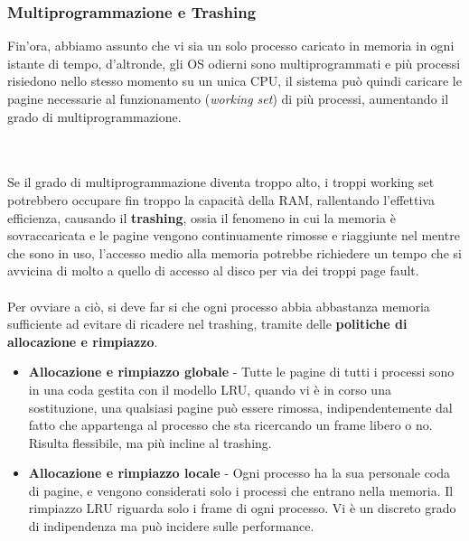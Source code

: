 \documentclass[12pt, letterpaper]{article}
\newcommand{\acc}{\\\hphantom{}\\}
\begin{document}
\subsubsection{Multiprogrammazione e Trashing}
Fin'ora, abbiamo assunto che vi sia un solo processo caricato in memoria in ogni istante di tempo, d'altronde, gli OS 
odierni sono multiprogrammati e più processi risiedono nello stesso momento su un unica CPU, il sistema può quindi 
caricare le pagine necessarie al funzionamento (\textit{working set}) di più processi, aumentando il grado di 
multiprogrammazione.\\  \begin{figure}[h]
\end{figure}\acc
Se il grado di multiprogrammazione diventa troppo alto, i troppi working set potrebbero occupare fin troppo la 
capacità della RAM, rallentando l'effettiva efficienza, causando il \textbf{trashing}, ossia il fenomeno in cui la 
memoria è sovraccaricata e le pagine vengono continuamente rimosse e riaggiunte nel mentre che sono in uso, l'accesso 
medio alla memoria potrebbe richiedere un tempo che si avvicina di molto a quello di accesso al disco per via dei troppi 
page fault.\acc Per ovviare a ciò, si deve far si che ogni processo abbia abbastanza memoria sufficiente ad evitare 
di ricadere nel trashing, tramite delle \textbf{politiche di allocazione e rimpiazzo}.\begin{itemize}
    \item \textbf{Allocazione e rimpiazzo globale} - Tutte le pagine di tutti i processi sono in 
    una coda gestita con il modello LRU, quando vi è in corso una sostituzione, una qualsiasi pagine può 
    essere rimossa, indipendentemente dal fatto che appartenga al processo che sta ricercando un frame libero o no.
    Risulta flessibile, ma più incline al trashing.
    \item \textbf{Allocazione e rimpiazzo locale} - Ogni processo ha la sua personale coda di pagine, e vengono 
    considerati solo i processi che entrano nella memoria. Il rimpiazzo LRU riguarda solo i frame di ogni processo. Vi è 
    un discreto grado di indipendenza ma può incidere sulle performance.
\end{itemize}
\end{document}
